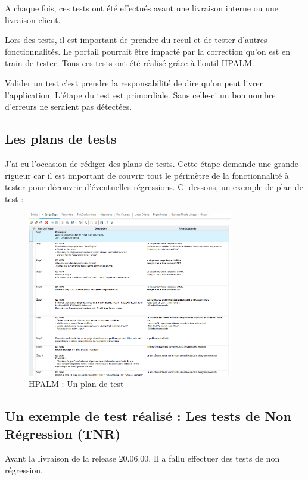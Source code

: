 A chaque fois, ces tests ont été effectués avant une livraison interne ou une livraison client.

Lors des tests, il est important de prendre du recul et de tester d'autres fonctionnalités. Le portail pourrait être impacté par la correction qu'on est en train de tester. Tous ces tests ont été réalisé grâce à l'outil HPALM.
        
Valider un test c'est prendre la responsabilité de dire qu'on peut livrer l'application. L'étape du test est primordiale. Sans celle-ci un bon nombre d'erreurs ne seraient pas détectées.

\subsection{Les plans de tests}

J'ai eu l'occasion de rédiger des plans de tests. Cette étape demande une grande rigueur car il est important de couvrir tout le périmètre de la fonctionnalité à tester pour découvrir d'éventuelles régressions. Ci-dessous, un exemple de plan de test :

\begin{figure}[!h]
\centering
\includegraphics[width=0.8\textwidth]{images/HPLMplantest.png}
\caption{HPALM : Un plan de test}
\end{figure}

\subsection{Un exemple de test réalisé : Les tests de Non Régression (TNR)}

Avant la livraison de la release 20.06.00. Il a fallu effectuer des tests de non régression.

